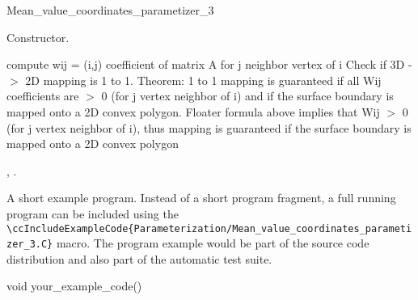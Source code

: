 \begin{ccRefClass}{Mean_value_coordinates_parametizer_3}
\ccCreation
{}  %

{
Constructor.
}


\ccOperations

{
compute wij = (i,j) coefficient of matrix A for j neighbor vertex of i
}
{
Check if 3D -$>$ 2D mapping is 1 to 1.
Theorem: 1 to 1 mapping is guaranteed if all Wij coefficients are $>$ 0 (for j vertex neighbor of i) and if the surface boundary is mapped onto a 2D convex polygon. Floater formula above implies that Wij $>$ 0 (for j vertex neighbor of i), thus mapping is guaranteed if the surface boundary is mapped onto a 2D convex polygon
}


\ccSeeAlso

,
.

\ccExample

A short example program.
Instead of a short program fragment, a full running program can be
included using the 
\verb|\ccIncludeExampleCode{Parameterization/Mean_value_coordinates_parametizer_3.C}| 
macro. The program example would be part of the source code distribution and
also part of the automatic test suite.

\begin{ccExampleCode}
void your_example_code() {
}
\end{ccExampleCode}


\end{ccRefClass}


